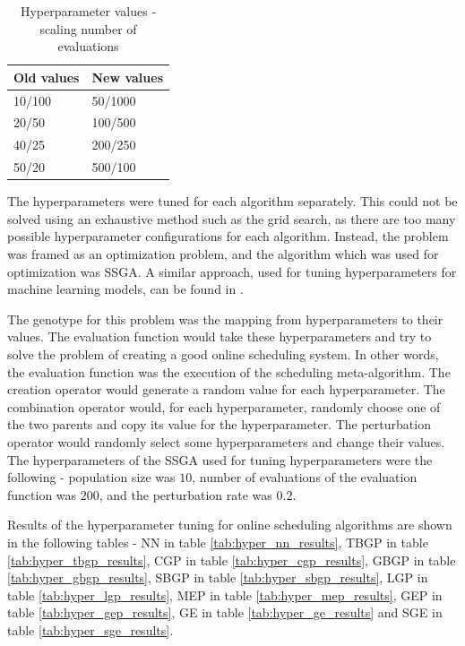 \begin{table}[!htbp]
    \begin{center}
        \begin{tabular}{|l|l|} 
         \hline
            Old values & New values \\ [0.5ex] \hline\hline
            10/100 & 50/1000 \\
            \hline
            20/50 & 100/500 \\
            \hline
            40/25 & 200/250 \\
            \hline
            50/20 & 500/100 \\
            \hline
        \end{tabular}
    \end{center}
    \caption{Hyperparameter values - scaling number of evaluations}
\label{tab:hyper_scale_evaluations}
\end{table}

The hyperparameters were tuned for each algorithm separately. This could not be solved using an exhaustive method such as the grid search, as there are too many possible hyperparameter configurations for each algorithm. Instead, the problem was framed as an optimization problem, and the algorithm which was used for optimization was SSGA. A similar approach, used for tuning hyperparameters for machine learning models, can be found in \citep{hyperopti}.

The genotype for this problem was the mapping from hyperparameters to their values. The evaluation function would take these hyperparameters and try to solve the problem of creating a good online scheduling system. In other words, the evaluation function was the execution of the scheduling meta-algorithm. The creation operator would generate a random value for each hyperparameter. The combination operator would, for each hyperparameter, randomly choose one of the two parents and copy its value for the hyperparameter. The perturbation operator would randomly select some hyperparameters and change their values. The hyperparameters of the SSGA used for tuning hyperparameters were the following - population size was $10$, number of evaluations of the evaluation function was $200$, and the perturbation rate was $0.2$.

Results of the hyperparameter tuning for online scheduling algorithms are shown in the following tables - NN in table \ref{tab:hyper_nn_results}, 
TBGP in table \ref{tab:hyper_tbgp_results}, CGP in table \ref{tab:hyper_cgp_results}, GBGP in table \ref{tab:hyper_gbgp_results}, SBGP in table \ref{tab:hyper_sbgp_results}, LGP in table \ref{tab:hyper_lgp_results}, MEP in table \ref{tab:hyper_mep_results}, GEP in table \ref{tab:hyper_gep_results}, GE in table \ref{tab:hyper_ge_results} and SGE in table \ref{tab:hyper_sge_results}.


